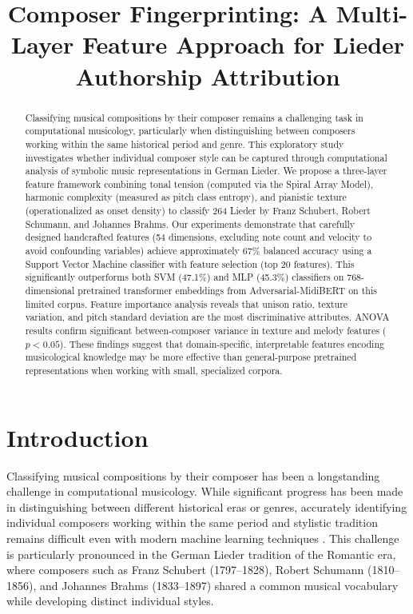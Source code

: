 \documentclass{article}
\title{Composer Fingerprinting: A Multi-Layer Feature Approach for Lieder Authorship Attribution}
\begin{document}
\maketitle

\begin{abstract}
Classifying musical compositions by their composer remains a challenging task in computational musicology, particularly when distinguishing between composers working within the same historical period and genre. This exploratory study investigates whether individual composer style can be captured through computational analysis of symbolic music representations in German Lieder. We propose a three-layer feature framework combining tonal tension (computed via the Spiral Array Model), harmonic complexity (measured as pitch class entropy), and pianistic texture (operationalized as onset density) to classify 264 Lieder by Franz Schubert, Robert Schumann, and Johannes Brahms. Our experiments demonstrate that carefully designed handcrafted features (54 dimensions, excluding note count and velocity to avoid confounding variables) achieve approximately 67\% balanced accuracy using a Support Vector Machine classifier with feature selection (top 20 features). This significantly outperforms both SVM (47.1\%) and MLP (45.3\%) classifiers on 768-dimensional pretrained transformer embeddings from Adversarial-MidiBERT on this limited corpus. Feature importance analysis reveals that unison ratio, texture variation, and pitch standard deviation are the most discriminative attributes. ANOVA results confirm significant between-composer variance in texture and melody features ($p < 0.05$). These findings suggest that domain-specific, interpretable features encoding musicological knowledge may be more effective than general-purpose pretrained representations when working with small, specialized corpora.
\end{abstract}

\section{Introduction}\label{sec:introduction}

Classifying musical compositions by their composer has been a longstanding challenge in computational musicology. While significant progress has been made in distinguishing between different historical eras or genres, accurately identifying individual composers working within the same period and stylistic tradition remains difficult even with modern machine learning techniques \cite{Alvarez2024}. This challenge is particularly pronounced in the German Lieder tradition of the Romantic era, where composers such as Franz Schubert (1797--1828), Robert Schumann (1810--1856), and Johannes Brahms (1833--1897) shared a common musical vocabulary while developing distinct individual styles.
\end{document}

